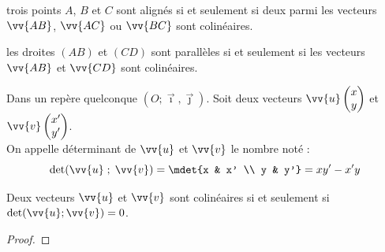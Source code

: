 \documentclass[main.tex]{subfiles}
\begin{document}
\begin{postulatT} trois points $A$, $B$ et $C$ sont alignés si et seulement si deux parmi les vecteurs $\vv{AB}$, $\vv{AC}$ ou $\vv{BC}$ sont colinéaires.
\end{postulatT}
\begin{postulatT} les droites $(AB)$ et  $(CD)$ sont parallèles si et seulement si  les vecteurs $\vv{AB}$ et $\vv{CD}$ sont colinéaires.
\end{postulatT}
\begin{definition}
Dans un repère quelconque $(O;\vec{\imath},\vec{\jmath})$. Soit deux vecteurs $\vv{u}\begin{pmatrix}
x\\y
\end{pmatrix}$ et $\vv{v}\begin{pmatrix}
x'\\y'
\end{pmatrix}$.\\
On appelle \og déterminant de $\vv{u}$ et $\vv{v}$ \fg{} le nombre noté :
\setlength{\abovedisplayskip}{3pt}
\setlength{\belowdisplayskip}{3pt} 
\[
\det(\vv{u}\; ; \; \vv{v}) = \mdet{x & x' \\ y & y'} = xy'- x'y
\]
\end{definition}
\begin{theorem} Deux vecteurs $\vv{u}$ et $\vv{v}$ sont colinéaires si et seulement si $\det(\vv{u};\vv{v})=0$.
\end{theorem}
\begin{proof}\hfill \vfill 
\end{proof}



\newpage 
{}  
\pagestyle{scrheadings} %
\onehalfspacing
\end{document}
